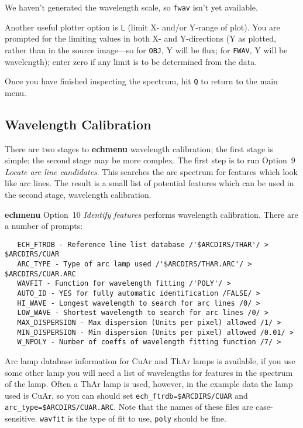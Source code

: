 \documentclass[twoside,11pt]{article}
\newcommand{\xref}[3]{#1}
\newcommand{\xlabel}[1]{}
\newcommand{\mlabel}[1]{\xlabel{#1}\label{#1}}
\newcommand{\scspec}[2]{#1}
\newcommand{\scspec}[2]{#2}
\begin{document}
We haven't generated the wavelength scale, so \verb+fwav+ isn't yet
available.

Another useful plotter option is \verb+L+ (limit X- and/or Y-range of plot).
You are prompted for the limiting values in both X- and Y-directions
(Y as plotted, rather than in the source image\scspec{---}{ - }so for
\verb+OBJ+, Y will be flux; for \verb+FWAV+, Y will be wavelength); enter
zero if any limit is to be determined from the data.

Once you have finished inspecting the spectrum, hit \verb+Q+ to return to
the main menu.


\subsection{\mlabel{example_wavelength_calibration}Wavelength Calibration}

There are two stages to \xref{{\bf echmenu}}{sun152}{ECHMENU}
wavelength calibration; the first stage is simple; the second stage may
be more complex.
The first step is to run
\xref{Option~9 {\sl Locate arc line candidates}}{sun152}{option9}\@.
This searches the arc spectrum for features which look like arc lines.
The result is a small list of potential features which can be used in
the second stage, wavelength calibration.

{\bf echmenu} \xref{Option~10 {\sl Identify features}}{sun152}{option10}
performs wavelength calibration.
There are a number of prompts:

{
\scspec{\small}{ }
\begin{verbatim}
   ECH_FTRDB - Reference line list database /'$ARCDIRS/THAR'/ > $ARCDIRS/CUAR
   ARC_TYPE - Type of arc lamp used /'$ARCDIRS/THAR.ARC'/ > $ARCDIRS/CUAR.ARC
   WAVFIT - Function for wavelength fitting /'POLY'/ >
   AUTO_ID - YES for fully automatic identification /FALSE/ >
   HI_WAVE - Longest wavelength to search for arc lines /0/ >
   LOW_WAVE - Shortest wavelength to search for arc lines /0/ >
   MAX_DISPERSION - Max dispersion (Units per pixel) allowed /1/ >
   MIN_DISPERSION - Min dispersion (Units per pixel) allowed /0.01/ >
   W_NPOLY - Number of coeffs of wavelength fitting function /7/ >
\end{verbatim}
}

Arc lamp database information for CuAr and ThAr lamps is available,
if you use some other lamp you will need a list of wavelengths for
features in the spectrum of the lamp.  Often a ThAr lamp is used,
however, in the example data the lamp used is CuAr,
so you can should set
\xref{{\tt ech\_ftrdb=\$ARCDIRS/CUAR}}{sun152}{par_ECH_FTRDB} and
\xref{{\tt arc\_type=\$ARCDIRS/CUAR.ARC}}{sun152}{par_ARC_TYPE}\@.
Note that the names of these files are case-sensitive.
\xref{{\tt{wavfit}}}{sun152}{par_WAVFIT} is the type of fit to use,
\verb+poly+ should be fine.
\end{document}
